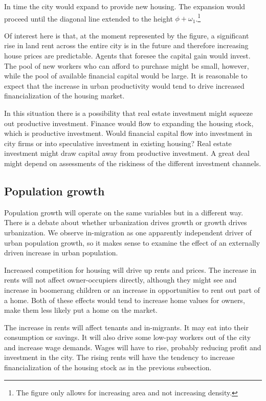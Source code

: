 In time the city would expand to provide new housing. The expansion would proceed until the diagonal line extended to the height $\phi+\omega_1$.\footnote{The figure only allows for increasing area and not increasing density.}  

Of interest here is that, at the moment represented by the figure, a significant rise in land rent across the entire city is in the future and therefore increasing house prices are predictable. Agents that foresee the capital gain would invest. The pool of new workers who can afford to purchase might be small, however, while the pool of available financial capital would be large. It is reasonable to expect that the increase in urban productivity would tend to drive increased financialization of the housing market.

In this situation there is a possibility that real estate investment might squeeze out productive investment. Finance would flow to expanding the housing stock, which is productive investment.  Would financial capital flow into investment in city firms or into speculative investment in existing housing? Real estate investment might  draw capital away from productive investment. A great deal might depend on assessments of the riskiness of the different investment channels.

\subsection{Population growth}
Population growth will operate on the same variables  but in a different way. There is a debate about whether urbanization drives  growth or growth drives urbanization. We observe in-migration as one apparently independent driver of urban population growth,  so it makes sense to examine the effect of an externally driven increase in urban population. 

Increased competition for housing will drive up rents and prices. The increase in rents will not affect owner-occupiers directly, although they might see and increase in boomerang children or an increase in opportunities to rent out part of a home. Both of these effects would tend to increase home values for owners, make them less likely put a home on the market. 

The increase in rents will affect tenants and in-migrants. It may eat into their consumption or savings. It will also drive some low-pay workers out of the city and increase wage demands. Wages will have to rise, probably reducing profit and investment in the city. The rising rents will have the tendency to increase financialization of the housing stock as in the previous subsection.

